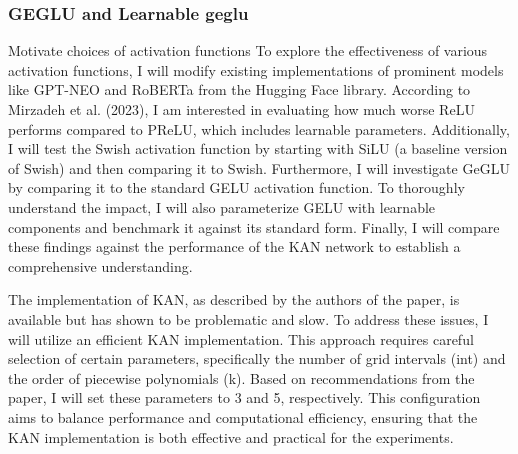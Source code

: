 \subsubsection{GEGLU and Learnable geglu}

Motivate choices of activation functions
To explore the effectiveness of various activation functions, I will modify existing implementations of prominent models like GPT-NEO and RoBERTa from the Hugging Face library. According to Mirzadeh et al. (2023), I am interested in evaluating how much worse ReLU performs compared to PReLU, which includes learnable parameters. Additionally, I will test the Swish activation function by starting with SiLU (a baseline version of Swish) and then comparing it to Swish. Furthermore, I will investigate GeGLU by comparing it to the standard GELU activation function. To thoroughly understand the impact, I will also parameterize GELU with learnable components and benchmark it against its standard form. Finally, I will compare these findings against the performance of the KAN network to establish a comprehensive understanding.

The implementation of KAN, as described by the authors of the paper, is available but has shown to be problematic and slow. To address these issues, I will utilize an efficient KAN implementation. This approach requires careful selection of certain parameters, specifically the number of grid intervals (int) and the order of piecewise polynomials (k). Based on recommendations from the paper, I will set these parameters to 3 and 5, respectively. This configuration aims to balance performance and computational efficiency, ensuring that the KAN implementation is both effective and practical for the experiments.